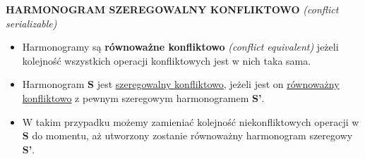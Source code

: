 \documentclass[a5paper,6pt]{article}
\begin{document}
    \textbf{HARMONOGRAM SZEREGOWALNY KONFLIKTOWO}
    \textit{(conflict serializable)}
    \begin{itemize}
        \item Harmonogramy są \textbf{równoważne konfliktowo}
              \textit{(conflict equivalent)} jeżeli kolejność wszystkich
              operacji konfliktowych jest w nich taka sama.
        \item Harmonogram \textbf{S} jest \underline{szeregowalny konfliktowo},
        jeżeli jest on \underline{równoważny} \underline{konfliktowo} z pewnym
        szeregowym harmonogramem \textbf{S'}.
        \item W takim przypadku możemy zamieniać kolejność niekonfliktowych
        operacji w \textbf{S} do momentu, aż utworzony zostanie równoważny
        harmonogram szeregowy \textbf{S'}.
    \end{itemize}
\end{document}

